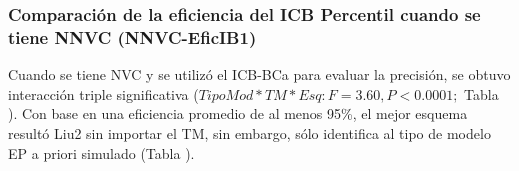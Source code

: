 
\subsubsection{Comparación de la eficiencia del ICB Percentil cuando se tiene NNVC (NNVC-EficIB1)}

Cuando se tiene NVC y se utilizó el ICB-BCa para evaluar la precisión, se obtuvo interacción triple significativa ($TipoMod*TM*Esq: F=3.60, P<0.0001;$ Tabla ). Con base en una eficiencia promedio de al menos 95\%, el mejor esquema resultó Liu2 sin importar el TM, sin embargo, sólo identifica al tipo de modelo EP a priori simulado (Tabla ).



